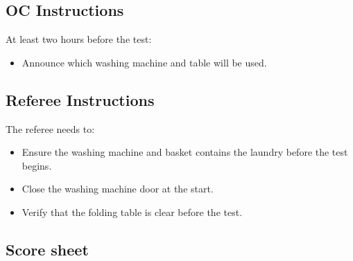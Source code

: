 \subsection*{OC Instructions}
At least two hours before the test:
\begin{itemize}
    \item Announce which washing machine and table will be used.
\end{itemize}

\subsection*{Referee Instructions}
The referee needs to:
\begin{itemize}
    \item Ensure the washing machine and basket contains the laundry before the test begins.
    \item Close the washing machine door at the start.
    \item Verify that the folding table is clear before the test.
\end{itemize}

\subsection*{Score sheet}

